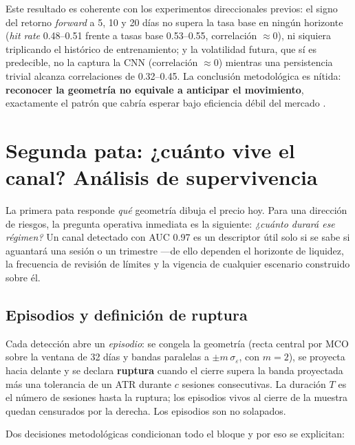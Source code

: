 \documentclass[11pt,a4paper]{article}
\begin{document}
Este resultado es coherente con los experimentos direccionales previos: el signo
del retorno \emph{forward} a 5, 10 y 20 días no supera la tasa base en ningún
horizonte (\emph{hit rate} 0.48--0.51 frente a tasas base 0.53--0.55, correlación
$\approx 0$), ni siquiera triplicando el histórico de entrenamiento; y la
volatilidad futura, que sí es predecible, no la captura la CNN (correlación
$\approx 0$) mientras una persistencia trivial alcanza correlaciones de
0.32--0.45. La conclusión metodológica es nítida: \textbf{reconocer la geometría
no equivale a anticipar el movimiento}, exactamente el patrón que cabría esperar
bajo eficiencia débil del mercado \cite{lo2000foundations,white2000reality}.

\section{Segunda pata: ¿cuánto vive el canal? Análisis de supervivencia}
\label{sec:parte2}
La primera pata responde \emph{qué} geometría dibuja el precio hoy. Para una
dirección de riesgos, la pregunta operativa inmediata es la siguiente:
\emph{¿cuánto durará ese régimen?} Un canal detectado con AUC 0.97 es un
descriptor útil solo si se sabe si aguantará una sesión o un trimestre —de ello
dependen el horizonte de liquidez, la frecuencia de revisión de límites y la
vigencia de cualquier escenario construido sobre él.

\subsection{Episodios y definición de ruptura}
Cada detección abre un \emph{episodio}: se congela la geometría (recta central
por MCO sobre la ventana de 32 días y bandas paralelas a $\pm m\,\sigma_
\varepsilon$, con $m=2$), se proyecta hacia delante y se declara \textbf{ruptura}
cuando el cierre supera la banda proyectada más una tolerancia de un ATR durante
$c$ sesiones consecutivas. La duración $T$ es el número de sesiones hasta la
ruptura; los episodios vivos al cierre de la muestra quedan censurados por la
derecha. Los episodios son no solapados.

Dos decisiones metodológicas condicionan todo el bloque y por eso se explicitan:
\end{document}
